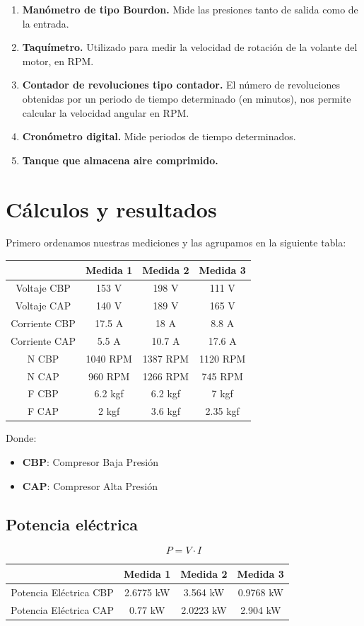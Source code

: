 \documentclass[a4paper,12pt]{report}
\begin{document}
\begin{enumerate}
\item \textbf{Manómetro de tipo Bourdon.} Mide las presiones tanto de salida como de la entrada.
\item \textbf{Taquímetro.} Utilizado para medir la velocidad de rotación de la volante del motor, en RPM.
\item \textbf{Contador de revoluciones tipo contador.} El número de revoluciones obtenidas por un periodo de tiempo determinado (en minutos), nos permite calcular la velocidad angular en RPM.
\item \textbf{Cronómetro digital.} Mide periodos de tiempo determinados.
\item \textbf{Tanque que almacena aire comprimido.}
\end{enumerate}
\chapter{Cálculos y resultados}
Primero ordenamos nuestras mediciones y las agrupamos en la siguiente tabla:
\begin{center}
\begin{tabular}{|c|c|c|c|}
\hline 
 & Medida 1 & Medida 2 & Medida 3 \\ 
\hline 
Voltaje CBP & 153 V & 198 V & 111 V \\ 
\hline 
Voltaje CAP & 140 V & 189 V & 165 V \\ 
\hline 
Corriente CBP & 17.5 A & 18 A & 8.8 A \\ 
\hline 
Corriente CAP & 5.5 A & 10.7 A & 17.6 A \\ 
\hline 
N CBP & 1040 RPM & 1387 RPM & 1120 RPM \\ 
\hline 
N CAP & 960 RPM & 1266 RPM & 745 RPM \\ 
\hline 
F CBP & 6.2 kgf & 6.2 kgf & 7 kgf \\ 
\hline 
F CAP & 2 kgf & 3.6 kgf & 2.35 kgf \\ 
\hline 
\end{tabular}
\end{center} 
Donde:
\begin{itemize}
\item \textbf{CBP}: Compresor Baja Presión
\item \textbf{CAP}: Compresor Alta Presión
\end{itemize}
\section{Potencia eléctrica}
$$
P = V\cdot I
$$
\begin{center}
\begin{tabular}{|c|c|c|c|}
\hline 
 & Medida 1 & Medida 2 & Medida 3 \\ 
\hline 
Potencia Eléctrica CBP & 2.6775 kW & 3.564 kW & 0.9768 kW \\ 
\hline 
Potencia Eléctrica CAP & 0.77 kW & 2.0223 kW & 2.904 kW \\ 
\hline 
\end{tabular} 
\end{center}
\end{document}
